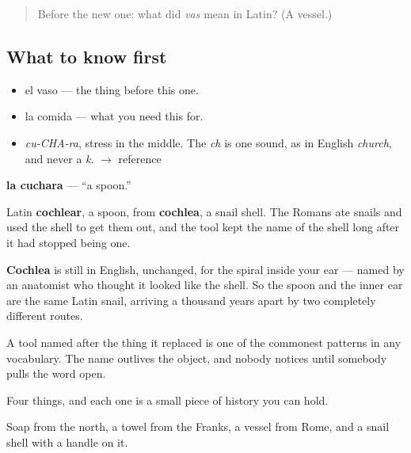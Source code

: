 \label{lesson:ES-C287-cuchara}



\begin{quote}
Before the new one: what did \emph{vas} mean in Latin? (A vessel.)
\end{quote}

\subsection*{What to know first}
\begin{itemize}
\raggedright
  \item el vaso — the thing before this one.
  \item la comida — what you need this for.
\end{itemize}

\begin{sounds}
\begin{itemize}
\raggedright
  \item \emph{cu-CHA-ra}, stress in the middle. The \emph{ch} is one sound, as in English \emph{church}, and never a \emph{k}. $\to$ reference
\end{itemize}
\end{sounds}

\begin{cousinweb}
\textbf{la cuchara} — \textquotedblleft{}a spoon.\textquotedblright{}

Latin \textbf{cochlear}, a spoon, from \textbf{cochlea}, a snail shell. The Romans ate snails and used the shell to get them out, and the tool kept the name of the shell long after it had stopped being one.

\textbf{Cochlea} is still in English, unchanged, for the spiral inside your ear — named by an anatomist who thought it looked like the shell. So the spoon and the inner ear are the same Latin snail, arriving a thousand years apart by two completely different routes.

A tool named after the thing it replaced is one of the commonest patterns in any vocabulary. The name outlives the object, and nobody notices until somebody pulls the word open.
\end{cousinweb}

\begin{grammarlens}[title={What you've built}]
Four things, and each one is a small piece of history you can hold.

Soap from the north, a towel from the Franks, a vessel from Rome, and a snail shell with a handle on it.
\end{grammarlens}

